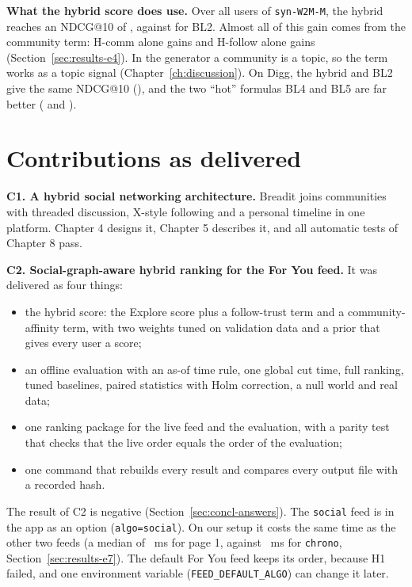 \textbf{What the hybrid score does use.} Over all users of \texttt{syn-W2M-M}, the hybrid reaches an NDCG@10 of \eOneWTwoMNdcgHTenAllValue{}, against \eOneWTwoMNdcgBLTwoTenAllValue{} for BL2. Almost all of this gain comes from the community term: H-comm alone gains \eFourWTwoMNdcgHCommTenAllGain{} and H-follow alone gains \eFourWTwoMNdcgHFollowTenAllGain{} (Section~\ref{sec:results-e4}). In the generator a community is a topic, so the term works as a topic signal (Chapter~\ref{ch:discussion}). On Digg, the hybrid and BL2 give the same NDCG@10 (\eOneDiggNdcgHTenAllValue{}), and the two ``hot'' formulas BL4 and BL5 are far better (\eOneDiggNdcgBLFourTenAllValue{} and \eOneDiggNdcgBLFiveTenAllValue{}).


\section{Contributions as delivered}
\label{sec:concl-contrib}

\textbf{C1. A hybrid social networking architecture.} Breadit joins communities with threaded discussion, X-style following and a personal timeline in one platform. Chapter 4 designs it, Chapter 5 describes it, and all automatic tests of Chapter 8 pass.

\textbf{C2. Social-graph-aware hybrid ranking for the For You feed.} It was delivered as four things:
\begin{itemize}
  \item the hybrid score: the Explore score plus a follow-trust term and a community-affinity term, with two weights tuned on validation data and a prior that gives every user a score;
  \item an offline evaluation with an as-of time rule, one global cut time, full ranking, tuned baselines, paired statistics with Holm correction, a null world and real data;
  \item one ranking package for the live feed and the evaluation, with a parity test that checks that the live order equals the order of the evaluation;
  \item one command that rebuilds every result and compares every output file with a recorded hash.
\end{itemize}
The result of C2 is negative (Section~\ref{sec:concl-answers}). The \texttt{social} feed is in the app as an option (\texttt{algo=social}). On our setup it costs the same time as the other two feeds (a median of \eSevenSocialMedian{}~ms for page 1, against \eSevenChronoMedian{}~ms for \texttt{chrono}, Section~\ref{sec:results-e7}). The default For You feed keeps its order, because H1 failed, and one environment variable (\texttt{FEED\_DEFAULT\_ALGO}) can change it later.

